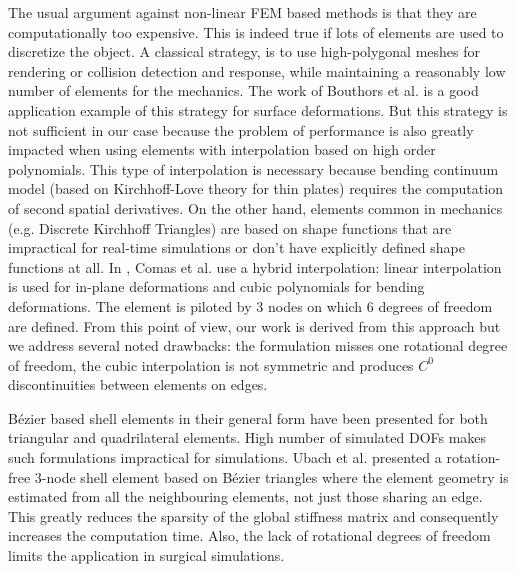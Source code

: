 \documentclass{egpubl}
\begin{document}
The usual argument against non-linear FEM based methods is that they are computationally too expensive. 
This is indeed true if lots of elements are used to discretize the object.
A classical strategy, is to use high-polygonal meshes for rendering or collision detection and response, while maintaining a reasonably low number of elements for the mechanics.
The work of Bouthors et al.\cite{Bouthors2007} is a good application example of this strategy for surface deformations.
But this strategy is not sufficient in our case because the problem of performance is also greatly impacted when using elements with interpolation based on high order polynomials.
This type of interpolation is necessary because bending continuum model
(based on Kirchhoff-Love theory for thin plates)  requires the computation of second spatial derivatives.
On the other hand, elements common in mechanics (e.g. Discrete Kirchhoff Triangles) are based on shape functions that are impractical for real-time simulations or don't have explicitly defined shape functions at all.
In \cite{Comas2010c}, Comas et al. use a hybrid interpolation: linear interpolation is used for in-plane deformations and cubic polynomials for bending deformations.
The element is piloted by 3 nodes on which 6 degrees of freedom are defined. 
From this point of view, our work is derived from this approach but we address several noted drawbacks: the formulation misses one rotational degree of freedom, the cubic interpolation is not symmetric and produces $C^0$  discontinuities between elements on edges.

B\'ezier based shell elements in their general form have been presented
for both triangular \cite{Ainsworth2011} and quadrilateral \cite{Boumechra2006} elements. High number of simulated DOFs makes such formulations impractical for simulations.
Ubach et al. \cite{Ubach2010} presented a rotation-free 3-node shell element based on B\'ezier triangles where the element geometry is estimated from all the neighbouring elements, not just those sharing an edge.
This greatly reduces the sparsity of the global stiffness matrix and consequently increases the computation time.
Also, the lack of rotational degrees of freedom limits the application in surgical simulations.

\end{document}

